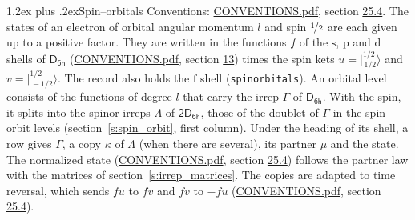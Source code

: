 \documentclass[10pt,a4paper]{article}
\makeatletter
\renewcommand\section{\@startsection{section}{1}{\z@}{-3ex plus -1ex minus -.2ex}%
  {1.2ex plus .2ex}{\normalfont\large\sffamily\bfseries\color{parttitle}}}
\numberwithin{equation}{section}
\newcommand{\grp}[1]{\mathsf{#1}}
\newcommand{\orbital}[1]{\mathrm{#1}}
\newcommand{\mult}{\kappa}
\newcommand{\intx}{\mu}
\newcommand{\jm}[2]{\bigl\lvert{}^{#1}_{\,#2}\bigr\rangle}
\makeatother
\begin{document}
\section{Spin--orbitals}\label{s:spin_orbitals}
Conventions: \href{../../CONVENTIONS.pdf}{CONVENTIONS.pdf}, section \href{../../CONVENTIONS.pdf\#conv.25.4}{25.4}.
\leavevmode\label{n:index.orbital.l}The states of an electron of orbital angular momentum $l$ and spin $\nicefrac{1}{2}$ are each given up to a positive factor. \label{n:local.spinor.uv}\label{n:local.function.f}They are written in the functions $f$ of the $\orbital{s}$, $\orbital{p}$ and $\orbital{d}$ shells of \href{../../../rotation/data/pdf/D6h.pdf}{$\grp{D_{6h}}$} (\href{../../CONVENTIONS.pdf}{CONVENTIONS.pdf}, section \href{../../../rotation/CONVENTIONS.pdf\#conv.13}{13}) times the spin kets $u = \jm{1/2}{1/2}$ and $v = \jm{1/2}{-1/2}$. The record also holds the $\orbital{f}$ shell (\texttt{spinorbitals}). An orbital level consists of the functions of degree $l$ that carry the irrep $\Gamma$ of \href{../../../rotation/data/pdf/D6h.pdf}{$\grp{D_{6h}}$}. With the spin, it splits into the spinor irreps $\Lambda$ of $\grp{2D_{6h}}$, those of the doublet of $\Gamma$ in the spin--orbit levels (section~\ref{s:spin_orbit}, first column). \label{n:head.state}Under the heading of its shell, a row gives $\Gamma$, a copy $\mult$ of $\Lambda$ (when there are several), its partner $\intx$ and the state. The normalized state (\href{../../CONVENTIONS.pdf}{CONVENTIONS.pdf}, section \href{../../CONVENTIONS.pdf\#conv.25.4}{25.4}) follows the partner law with the matrices of section~\ref{s:irrep_matrices}. The copies are adapted to time reversal, which sends $f u$ to $f v$ and $f v$ to $-f u$ (\href{../../CONVENTIONS.pdf}{CONVENTIONS.pdf}, section \href{../../CONVENTIONS.pdf\#conv.25.4}{25.4}).
\end{document}
